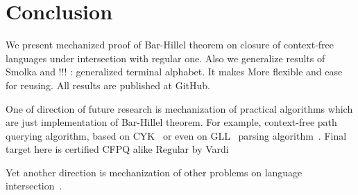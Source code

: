 \section{Conclusion}

We present mechanized proof of Bar-Hillel theorem on closure of context-free languages under intersection with regular one.
Also we generalize results of Smolka and !!! : generalized terminal alphabet. 
It makes More flexible and ease for reusing.
All results are published at GitHub.

One of direction of future research is mechanization of practical algorithms which are just implementation of Bar-Hillel theorem.
For example, context-free path querying algorithm, based on CYK~\cite{Hellings,RDF} or even on GLL~\cite{scott2010gll} parsing algorithm~\cite{grigorev2016context}.
Final target here is certified CFPQ alike Regular by Vardi

Yet another direction is mechanization of other problems on language intersection~\cite{nederhof2002parsing, nederhof2004language}.

